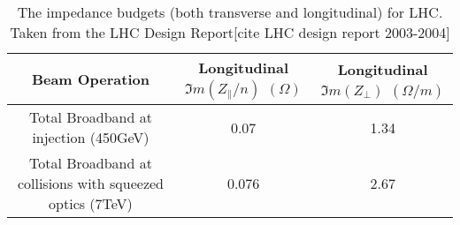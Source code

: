 \begin{table}
\caption{The impedance budgets (both transverse and longitudinal) for LHC. Taken from the LHC Design Report[cite LHC design report 2003-2004]}
\begin{center}
\begin{tabular}{c | c | c}
Beam Operation & Longitudinal $\Im{}m ( Z_{\parallel}/n )$ $( \Omega )$ & Longitudinal $\Im{}m ( Z_{\perp} )$ $( \Omega /m )$\\ \hline
Total Broadband at injection (450GeV) & 0.07 & 1.34 \\ \hline
Total Broadband at collisions with squeezed optics (7TeV) & 0.076 & 2.67 \\ \hline
\end{tabular}
\end{center}
\label{tab:lhc-impedance-budget}
\end{table}
